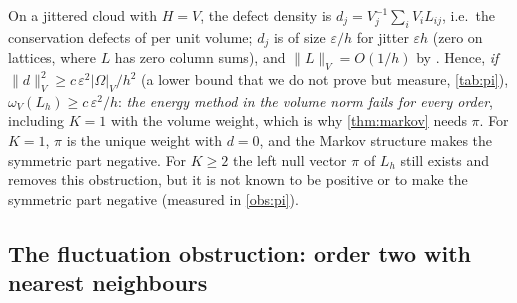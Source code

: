 \documentclass[11pt,a4paper]{article}
\theoremstyle{plain}
\theoremstyle{definition}
\theoremstyle{remark}
\numberwithin{equation}{section}
\newcommand{\A}[1]{\cite[#1]{Addendum}}
\begin{document}
On a jittered cloud with $H=V$, the defect density is $d_j=V_j^{-1}\sum_iV_iL_{ij}$, i.e.\ the conservation defects of \A{Prop.~4.4} per unit volume; $d_j$ is of size $\varepsilon/h$ for jitter $\varepsilon h$ (zero on lattices, where $L$ has zero column sums), and $\|L\|_V=O(1/h)$ by \A{Lem.~3.5}. Hence, \emph{if} $\|d\|_V^2\ge c\,\varepsilon^2|\Omega|_V/h^2$ (a lower bound that we do not prove but measure, \cref{tab:pi}), $\omega_V(L_h)\ge c\,\varepsilon^2/h$: \emph{the energy method in the volume norm fails for every order}, including $K=1$ with the volume weight, which is why \cref{thm:markov} needs $\pi$. For $K=1$, $\pi$ is the unique weight with $d=0$, and the Markov structure makes the symmetric part negative. For $K\ge2$ the left null vector $\pi$ of $L_h$ still exists and removes this obstruction, but it is not known to be positive or to make the symmetric part negative (measured in \cref{obs:pi}).

\subsection{The fluctuation obstruction: order two with nearest neighbours}
\end{document}
